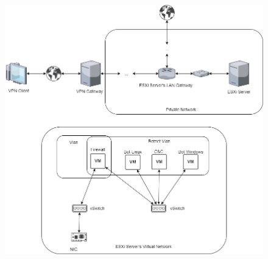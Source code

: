 \begin{frame}
\begin{columns}
\begin{column}{0.6\textwidth}
\begin{figure}
                \includegraphics[width=\textwidth]{res/fig/infrastruttura1.png}
            \end{figure}
        \end{column}
    \end{columns}
\end{frame}

